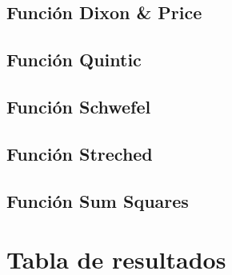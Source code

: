 \documentclass[10pt]{article}
\begin{document}
\subsection{Función Dixon \& Price}
\begin{center}
  
\end{center}

\subsection{Función Quintic}
\begin{center}
  
\end{center}

\subsection{Función Schwefel}
\begin{center}
  
\end{center}

\subsection{Función Streched}
\begin{center}
  
\end{center}

\subsection{Función Sum Squares}
\begin{center}
  
\end{center}

\section{Tabla de resultados}



\end{document}

